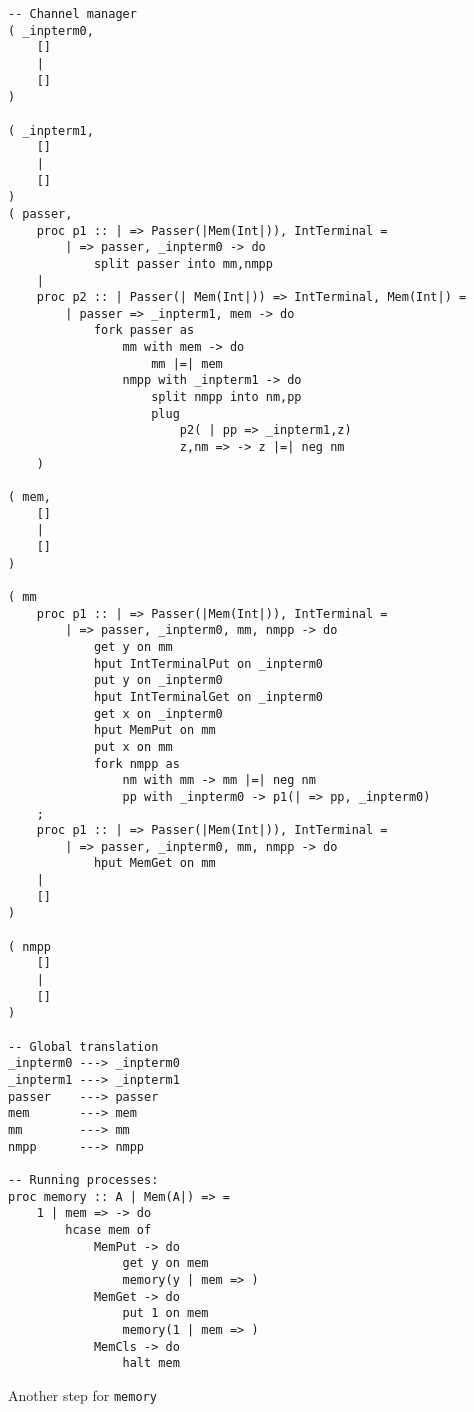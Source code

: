 \documentclass{article}
\theoremstyle{plain}%
\theoremstyle{definition}
\theoremstyle{remark}
\begin{document}
\begin{verbatim}
-- Channel manager
( _inpterm0,  
    []
    |
    []
)

( _inpterm1,  
    []
    |
    []
)
( passer,
    proc p1 :: | => Passer(|Mem(Int|)), IntTerminal = 
        | => passer, _inpterm0 -> do
            split passer into mm,nmpp 
    |
    proc p2 :: | Passer(| Mem(Int|)) => IntTerminal, Mem(Int|) =
        | passer => _inpterm1, mem -> do
            fork passer as
                mm with mem -> do
                    mm |=| mem
                nmpp with _inpterm1 -> do
                    split nmpp into nm,pp
                    plug
                        p2( | pp => _inpterm1,z)
                        z,nm => -> z |=| neg nm
    )

( mem,
    []
    |
    []
)

( mm
    proc p1 :: | => Passer(|Mem(Int|)), IntTerminal = 
        | => passer, _inpterm0, mm, nmpp -> do
            get y on mm
            hput IntTerminalPut on _inpterm0
            put y on _inpterm0
            hput IntTerminalGet on _inpterm0
            get x on _inpterm0
            hput MemPut on mm
            put x on mm
            fork nmpp as
                nm with mm -> mm |=| neg nm 
                pp with _inpterm0 -> p1(| => pp, _inpterm0)
    ;
    proc p1 :: | => Passer(|Mem(Int|)), IntTerminal = 
        | => passer, _inpterm0, mm, nmpp -> do
            hput MemGet on mm 
    |
    []
)

( nmpp
    []
    |
    []
)

-- Global translation
_inpterm0 ---> _inpterm0 
_inpterm1 ---> _inpterm1 
passer    ---> passer 
mem       ---> mem
mm        ---> mm
nmpp      ---> nmpp

-- Running processes:
proc memory :: A | Mem(A|) => =
    1 | mem => -> do
        hcase mem of
            MemPut -> do
                get y on mem
                memory(y | mem => )
            MemGet -> do
                put 1 on mem
                memory(1 | mem => )
            MemCls -> do
                halt mem
\end{verbatim}
Another step for \verb|memory|
\end{document}

